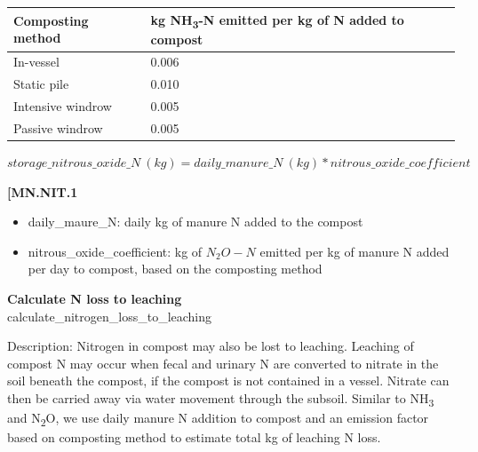 \begin{refsection}
\begin{table}[h!]
    \begin{tabular}{@{} C{3cm} C{4cm}  @{}}
    \toprule
    \textbf{Composting method} & \textbf{kg NH\textsubscript{3}-N emitted per kg of N added to compost}   \\
    \midrule


In-vessel & 0.006 \\
Static pile & 0.010 \\
Intensive windrow & 0.005 \\
Passive windrow & 0.005 \\


    \bottomrule
    \end{tabular}
    \end{table} 
            \vspace{0.25cm}

        \begin{center}
            \(storage\_nitrous\_oxide\_N\ (kg) = daily\_manure\_N\ (kg) * nitrous\_oxide\_coefficient\)
        \end{center}
        \vspace{0.5cm} 
    
            {\raggedleft \textbf{[MN.NIT.1}\par}
            \vspace{0.5cm}
            
        \begin{itemize}
            \item daily\_maure\_N: daily kg of manure N added to the compost
            \item nitrous\_oxide\_coefficient: kg of \(N_2O-N\) emitted per kg of manure N added per day to compost, based on the composting method 

        \end{itemize}


\textbf{Calculate N loss to leaching}\\
calculate\_nitrogen\_loss\_to\_leaching\\
\vspace{0.2cm}

Description: Nitrogen in compost may also be lost to leaching. Leaching of compost N may occur when fecal and urinary N are converted to nitrate in the soil beneath the compost, if the compost is not contained in a vessel. Nitrate can then be carried away via water movement through the subsoil. Similar to NH\textsubscript{3} and N\textsubscript{2}O, we use daily manure N addition to compost and an emission factor based on composting method \parencite{Hanson2024} to estimate total kg of leaching N loss.


\end{refsection}
